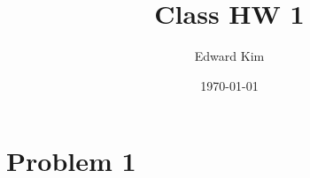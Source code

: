 \documentclass[12pt]{article}%
\title{Class HW 1}
\author{Edward Kim}
\date{\today}
\begin{document}
\maketitle

\section{Problem 1}
\end{document}
